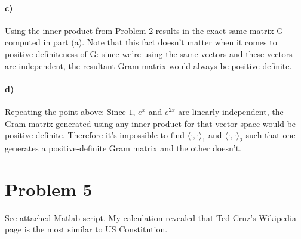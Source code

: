 \documentclass[10pt,letter]{article}
\newcommand{\inner}{\langle\cdot,\cdot\rangle}
\begin{document}
\paragraph{c)} Using the inner product from Problem 2 results in the exact same matrix G computed in part (a). Note that this fact doesn't matter when it comes to positive-definiteness of G: since we're using the same vectors and these vectors are independent, the resultant Gram matrix would always be positive-definite.

\paragraph{d)} Repeating the point above: Since $1$, $e^x$ and $e^{2x}$ are linearly independent, the Gram matrix generated using any inner product for that vector space would be positive-definite. Therefore it's impossible to find $\inner_1$ and $\inner_2$ such that one generates a positive-definite Gram matrix and the other doesn't.

\section{Problem 5}

See attached Matlab script. My calculation revealed that Ted Cruz's Wikipedia page is the most similar to US Constitution.
\end{document}

